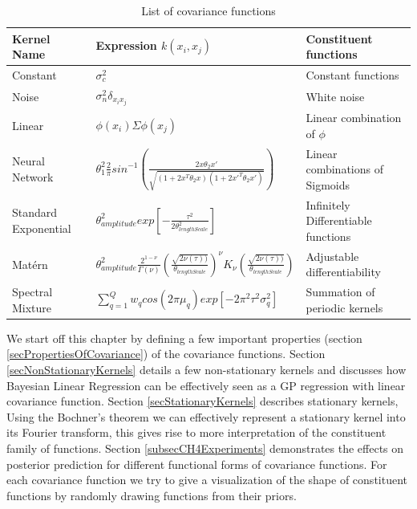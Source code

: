 \begin{table}[!ht]
    \centering
\begin{tabularx}{\textwidth}{|l|l|X|}
  \hline
Kernel Name  & Expression $k(x_{i}, x_{j})$ & Constituent functions \\
  \hline 
  \hline
Constant & \small $\sigma_{c}^2$ & Constant functions \normalsize\\
  \hline 
Noise & \small $\sigma_{n}^2\delta_{x_{i}x_{j}}$ & White noise \normalsize\\
  \hline 
Linear & \small $\phi(x_{i})\Sigma\phi(x_{j})$ & Linear combination of $\phi$ \normalsize\\
  \hline 
Neural Network & \small $\theta_{1}^{2}\frac{2}{\pi} sin^{-1}\left ( \frac{2x\theta_{2}x'}{\sqrt{(1+2x^{T}\theta_{2}x)(1+2x'^{T}\theta_{2}x')}} \right )$ & Linear combinations of Sigmoids \normalsize\\
  \hline 
Standard Exponential & \small $\theta_{amplitude}^2exp[-\frac{\tau^2}{2\theta_{lengthScale}^2}]$ & Infinitely Differentiable functions \normalsize\\ 
  \hline 
Mat\'ern & \small $\theta_{amplitude}^2\frac{2^{1- \nu }}{\Gamma (\nu)}\left ( \frac{\sqrt{2\nu(\tau))}}{\theta_{lengthScale}} \right )^{\nu}K_{\nu}\left ( \frac{\sqrt{2\nu(\tau))}}{\theta_{lengthScale}} \right)$ & Adjustable differentiability \normalsize\\
  \hline 
Spectral Mixture & \small  $\sum_{q=1}^{Q}w_{q}cos(2\pi\mu_{q}) exp[-2\pi^{2}\tau^{2}\sigma_{q}^2]$ & Summation of periodic kernels \normalsize\\
   \hline
\end{tabularx}
  \label{tabListOfCovarianceFUnctions}
  \caption{List of covariance functions}
  \end{table}
  
We start off this chapter by defining a few important properties (section \ref{secPropertiesOfCovariance}) of the covariance functions. Section \ref{secNonStationaryKernels} details a few non-stationary kernels and discusses how Bayesian Linear Regression can be effectively seen as a GP regression with linear covariance function. Section \ref{secStationaryKernels} describes stationary kernels, Using the Bochner's theorem we can effectively represent a stationary kernel into its Fourier transform, this gives rise to more interpretation of the constituent family of functions. Section \ref{subsecCH4Experiments} demonstrates the effects on posterior prediction for different functional forms of covariance functions. For each covariance function we try to give a visualization of the shape of constituent functions by randomly drawing functions from their priors. 

